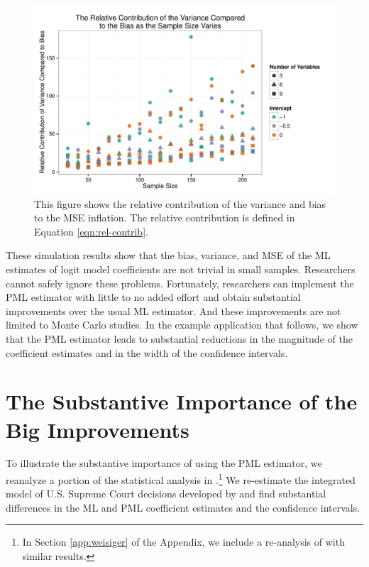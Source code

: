 \documentclass[12pt]{article}
\begin{document}
\begin{figure}[h]
\begin{center}
\includegraphics[scale = 0.7]{figs/relcontrib-n-scatter.pdf}
\caption{This figure shows the relative contribution of the variance and bias to the MSE inflation. The relative contribution is defined in Equation \ref{eqn:rel-contrib}.}\label{fig:relcontrib-n-scatter}
\end{center}
\end{figure}

These simulation results show that the bias, variance, and MSE of the ML estimates of logit model coefficients are not trivial in small samples.
Researchers cannot safely ignore these problems.
Fortunately, researchers can implement the PML estimator with little to no added effort and obtain substantial improvements over the usual ML estimator. 
And these improvements are not limited to Monte Carlo studies. 
In the example application that follows, we show that the PML estimator leads to substantial reductions in the magnitude of the coefficient estimates and in the width of the confidence intervals.

\section*{The Substantive Importance of the Big Improvements}

To illustrate the substantive importance of using the PML estimator, we reanalyze a portion of the statistical analysis in \cite{GeorgeEpstein1992}.\footnote{In Section \ref{app:weisiger} of the Appendix, we include a re-analysis of \cite{Weisiger2014} with similar results.}
We re-estimate the integrated model of U.S. Supreme Court decisions developed by \cite{GeorgeEpstein1992} and find substantial differences in the ML and PML coefficient estimates and the confidence intervals.
\end{document}
